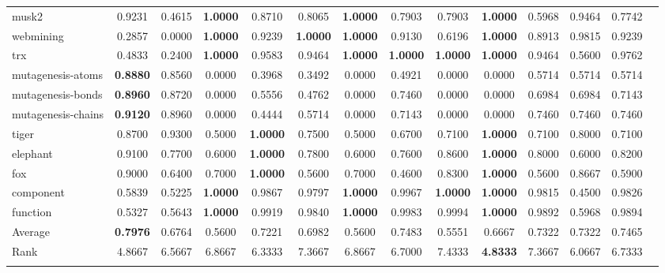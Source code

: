 \documentclass[reqno]{vcuthesis}
\numberwithin{equation}{chapter}
\begin{document}
\begin{table}[H]
{\begin{tabular}{l@{\extracolsep{\fill}}ccccccccccccc}
musk2 &0.9231 &0.4615 &\textbf{1.0000} &0.8710 &0.8065 &\textbf{1.0000} &0.7903 &0.7903 &\textbf{1.0000} &0.5968 &0.9464 &0.7742   \\
webmining &0.2857 &0.0000 &\textbf{1.0000} &0.9239 &\textbf{1.0000} &\textbf{1.0000} &0.9130 &0.6196 &\textbf{1.0000} &0.8913 &0.9815 &0.9239   \\
trx &0.4833 &0.2400 &\textbf{1.0000} &0.9583 &0.9464 &\textbf{1.0000} &\textbf{1.0000} &\textbf{1.0000} &\textbf{1.0000} &0.9464 &0.5600 &0.9762   \\
mutagenesis-atoms &\textbf{0.8880} &0.8560 &0.0000 &0.3968 &0.3492 &0.0000 &0.4921 &0.0000 &0.0000 &0.5714 &0.5714 &0.5714   \\
mutagenesis-bonds &\textbf{0.8960} &0.8720 &0.0000 &0.5556 &0.4762 &0.0000 &0.7460 &0.0000 &0.0000 &0.6984 &0.6984 &0.7143   \\
mutagenesis-chains &\textbf{0.9120} &0.8960 &0.0000 &0.4444 &0.5714 &0.0000 &0.7143 &0.0000 &0.0000 &0.7460 &0.7460 &0.7460   \\
tiger &0.8700 &0.9300 &0.5000 &\textbf{1.0000} &0.7500 &0.5000 &0.6700 &0.7100 &\textbf{1.0000} &0.7100 &0.8000 &0.7100   \\
elephant &0.9100 &0.7700 &0.6000 &\textbf{1.0000} &0.7800 &0.6000 &0.7600 &0.8600 &\textbf{1.0000} &0.8000 &0.6000 &0.8200   \\
fox &0.9000 &0.6400 &0.7000 &\textbf{1.0000} &0.5600 &0.7000 &0.4600 &0.8300 &\textbf{1.0000} &0.5600 &0.8667 &0.5900   \\
component &0.5839 &0.5225 &\textbf{1.0000} &0.9867 &0.9797 &\textbf{1.0000} &0.9967 &\textbf{1.0000} &\textbf{1.0000} &0.9815 &0.4500 &0.9826   \\
function &0.5327 &0.5643 &\textbf{1.0000} &0.9919 &0.9840 &\textbf{1.0000} &0.9983 &0.9994 &\textbf{1.0000} &0.9892 &0.5968 &0.9894   \\
\noalign{\smallskip}\hline\noalign{\smallskip}
Average &\textbf{0.7976} &0.6764 &0.5600 &0.7221 &0.6982 &0.5600 &0.7483 &0.5551 &0.6667 &0.7322 &0.7322 &0.7465   \\
Rank &4.8667 &6.5667 &6.8667 &6.3333 &7.3667 &6.8667 &6.7000 &7.4333 &\textbf{4.8333} &7.3667 &6.0667 &6.7333   \\
\noalign{\smallskip}\hline
\end{tabular}}
\end{table}
\end{document}
